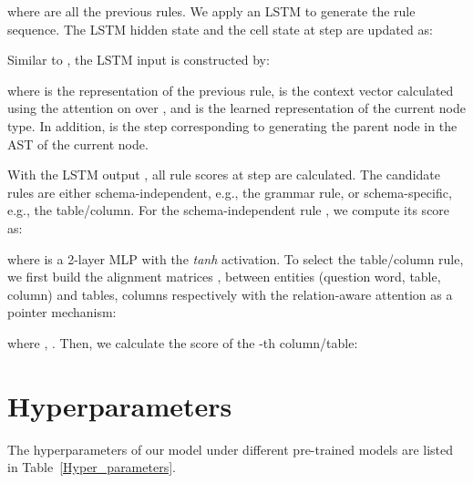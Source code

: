 \documentclass{article}
\begin{document}
where  are all the previous rules. We apply an LSTM \citep{hochreiter1997long} to generate the rule sequence.
The LSTM hidden state  and the cell state  at step  are updated as:

Similar to \citet{wang2020rat}, the LSTM input  is constructed by:

where  is the representation of the previous rule,  is the context vector calculated using the attention on  over , and  is the learned representation of the current node type.
In addition,  is the step corresponding to generating the parent node in the AST of the current node.

With the LSTM output , all rule scores at step   are calculated.
The candidate rules are either schema-independent, e.g., the grammar rule, or schema-specific, e.g., the table/column.
For the schema-independent rule , we compute its score as:

where  is a 2-layer MLP with the \emph{tanh} activation.
To select the table/column rule, we first build the alignment matrices ,  between entities (question word, table, column) and tables, columns respectively with the relation-aware attention as a pointer mechanism:

where , . Then, we calculate the score of the -th column/table:


\section{Hyperparameters}
\label{app_hyperparameters}
The hyperparameters of our model under different pre-trained models are listed in Table~\ref{Hyper_parameters}.
\end{document}
